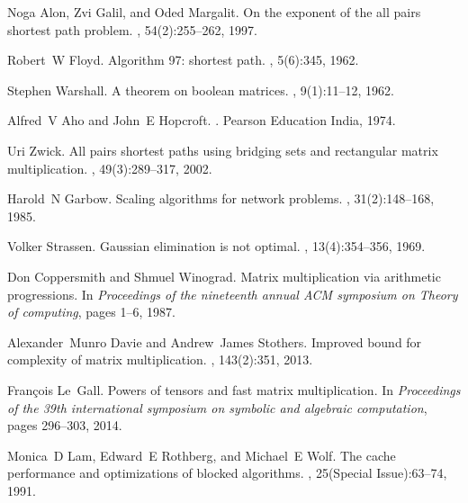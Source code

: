 \documentclass[review]{cvpr}
\begin{document}
{\small

%
\begin{thebibliography}{10}


Noga Alon, Zvi Galil, and Oded Margalit.
\newblock On the exponent of the all pairs shortest path problem.
, 54(2):255--262, 1997.


Robert~W Floyd.
\newblock Algorithm 97: shortest path.
, 5(6):345, 1962.


Stephen Warshall.
\newblock A theorem on boolean matrices.
, 9(1):11--12, 1962.

Alfred~V Aho and John~E Hopcroft.
.
\newblock Pearson Education India, 1974.


Uri Zwick.
\newblock All pairs shortest paths using bridging sets and rectangular matrix
  multiplication.
, 49(3):289--317, 2002.


Harold~N Garbow.
\newblock Scaling algorithms for network problems.
, 31(2):148--168, 1985.


Volker Strassen.
\newblock Gaussian elimination is not optimal.
, 13(4):354--356, 1969.


Don Coppersmith and Shmuel Winograd.
\newblock Matrix multiplication via arithmetic progressions.
\newblock In {\em Proceedings of the nineteenth annual ACM symposium on Theory
  of computing}, pages 1--6, 1987.

Alexander~Munro Davie and Andrew~James Stothers.
\newblock Improved bound for complexity of matrix multiplication.
, 143(2):351, 2013.

Fran{\c{c}}ois Le~Gall.
\newblock Powers of tensors and fast matrix multiplication.
\newblock In {\em Proceedings of the 39th international symposium on symbolic
  and algebraic computation}, pages 296--303, 2014.


Monica~D Lam, Edward~E Rothberg, and Michael~E Wolf.
\newblock The cache performance and optimizations of blocked algorithms.
, 25(Special Issue):63--74,
  1991.



\end{thebibliography}}
\end{document}
